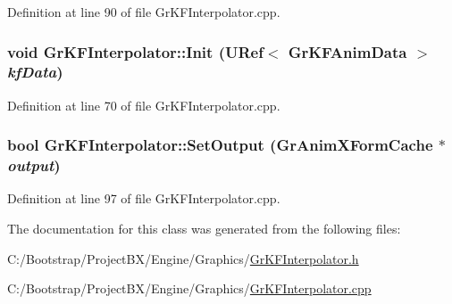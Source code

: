 Definition at line 90 of file GrKFInterpolator.cpp.\hypertarget{class_gr_k_f_interpolator_6eb1b4094005a7234edd5ca8362f5a6a}{
\subsubsection[{Init}]{\setlength{\rightskip}{0pt plus 5cm}void GrKFInterpolator::Init ({\bf URef}$<$ {\bf GrKFAnimData} $>$ {\em kfData})}}
\label{class_gr_k_f_interpolator_6eb1b4094005a7234edd5ca8362f5a6a}




Definition at line 70 of file GrKFInterpolator.cpp.\hypertarget{class_gr_k_f_interpolator_e68da306a8aeeb0b485770cd7e813390}{
\subsubsection[{SetOutput}]{\setlength{\rightskip}{0pt plus 5cm}bool GrKFInterpolator::SetOutput ({\bf GrAnimXFormCache} $\ast$ {\em output})}}
\label{class_gr_k_f_interpolator_e68da306a8aeeb0b485770cd7e813390}




Definition at line 97 of file GrKFInterpolator.cpp.

The documentation for this class was generated from the following files:\begin{CompactItemize}
\item 
C:/Bootstrap/ProjectBX/Engine/Graphics/\hyperlink{_gr_k_f_interpolator_8h}{GrKFInterpolator.h}\item 
C:/Bootstrap/ProjectBX/Engine/Graphics/\hyperlink{_gr_k_f_interpolator_8cpp}{GrKFInterpolator.cpp}\end{CompactItemize}

